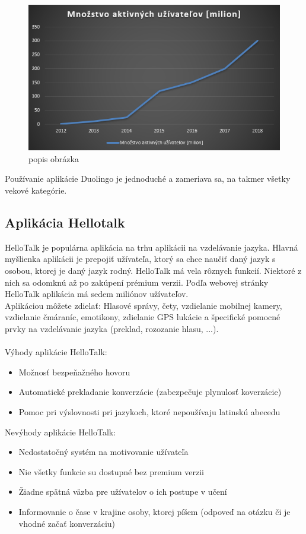 \documentclass[10pt,oneside,slovak,a4paper]{article}
\begin{document}
\begin{figure} %
\centering
\includegraphics[width=\textwidth]{duolingo.png}
\caption{popis obrázka}
\label{duo-uzivatelia}
\end{figure}

Používanie aplikácie Duolingo je jednoduché a zameriava sa, na takmer všetky vekové kategórie\cite{duolingo}.
\subsection{Aplikácia Hellotalk} %
HelloTalk je populárna aplikácia na trhu aplikácii na vzdelávanie jazyka. Hlavná myšlienka aplikácii je prepojiť užívateľa, ktorý sa chce naučiť daný jazyk s osobou, ktorej je daný jazyk rodný. HelloTalk má vela rôznych funkcií. Niektoré z nich sa odomknú až po zakúpení prémium verzii. Podľa webovej stránky HelloTalk aplikácia má sedem miliónov užívateľov.   \cite{hellotalk}\\
Aplikáciou môžete zdielať: Hlasové správy, čety,  vzdielanie mobilnej kamery, vzdielanie čmáraníc, emotikony, zdielanie GPS lukácie a špecifické pomocné prvky na vzdelávanie jazyka (preklad, rozozanie hlasu, ...)\cite{hellotalk}.\\
\\
Výhody aplikácie HelloTalk:\cite{hellotalk}
\begin{itemize}
\item Možnosť bezpeňažného hovoru
\item Automatické prekladanie konverzácie (zabezpečuje plynulosť koverzácie)
\item Pomoc pri výslovnosti pri jazykoch, ktoré nepoužívaju latinskú abecedu\\
\end{itemize}


Nevýhody aplikácie HelloTalk:\cite{hellotalk}
\begin{itemize}
\item Nedostatočný systém na motivovanie užívateľa
\item Nie všetky funkcie su dostupné bez premium verzii
\item Žiadne spätná väzba pre užívatelov o ich postupe v učení 
\item Informovanie o čase v krajine osoby, ktorej píšem (odpoveď na otázku či je vhodné začať konverzáciu)
\end{itemize}
\end{document}

